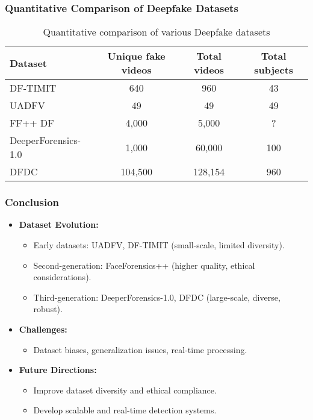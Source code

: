 \documentclass{beamer}
\begin{document}
\begin{frame}
    \frametitle{Quantitative Comparison of Deepfake Datasets}
    \begin{table}[ht]
        \centering
        \caption{Quantitative comparison of various Deepfake datasets}
        \begin{tabular}{lccc}
            \toprule
            \textbf{Dataset} & \textbf{Unique fake videos} & \textbf{Total videos} & \textbf{Total subjects} \\ 
            \midrule
            DF-TIMIT         & 640     & 960     & 43   \\
            UADFV            & 49      & 49      & 49   \\
            FF++ DF          & 4,000   & 5,000   & ?    \\
            DeeperForensics-1.0 & 1,000 & 60,000  & 100  \\
            DFDC             & 104,500 & 128,154 & 960  \\
            \bottomrule
        \end{tabular}
        \label{tab:deepfake_comparison}
    \end{table}
\end{frame}

\begin{frame}
    \frametitle{Conclusion}
    \begin{itemize}
        \item \textbf{Dataset Evolution:}
            \begin{itemize}
                \item Early datasets: UADFV, DF-TIMIT (small-scale, limited diversity).
                \item Second-generation: FaceForensics++ (higher quality, ethical considerations).
                \item Third-generation: DeeperForensics-1.0, DFDC (large-scale, diverse, robust).
            \end{itemize}
        \item \textbf{Challenges:}
            \begin{itemize}
                \item Dataset biases, generalization issues, real-time processing.
            \end{itemize}
        \item \textbf{Future Directions:}
            \begin{itemize}
                \item Improve dataset diversity and ethical compliance.
                \item Develop scalable and real-time detection systems.
            \end{itemize}
    \end{itemize}
\end{frame}
\end{document}
